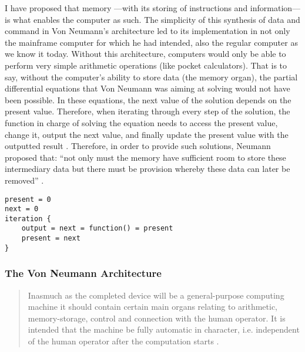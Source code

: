 I have proposed that memory ---with its storing of instructions and information--- is what enables the computer as such. The simplicity of this synthesis of data and command in Von Neumann's architecture led to its implementation in not only the mainframe computer for which he had intended, also the regular computer as we know it today. Without this architecture, computers would only be able to perform very simple arithmetic operations (like pocket calculators). That is to say, without the computer's ability to store data (the memory organ), the partial differential equations that Von Neumann was aiming at solving would not have been possible. In these equations, the next value of the solution depends on the present value. Therefore, when iterating through every step of the solution, the function in charge of solving the equation needs to access the present value, change it, output the next value, and finally update the present value with the outputted result . Therefore, in order to provide such solutions, Neumann proposed that: ``not only must the memory have sufficient room to store these intermediary data but there must be provision whereby these data can later be removed'' \parencite[3]{von46:Pre}.

\begin{flushleft}
\small
\begin{lstlisting}[caption={Pseudocode showing a routine whose next value depends on the present value.},captionpos=b,label={lst:neumann}]
present = 0
next = 0
iteration {
	output = next = function() = present
	present = next
}
\end{lstlisting}
\end{flushleft}


\subsubsection{The Von Neumann Architecture}

\begin{quote}
	Inasmuch as the completed device will be a general-purpose computing machine it should contain certain main organs relating to arithmetic, memory-storage, control and connection with the human operator. It is intended that the machine be fully automatic in character, i.e. independent of the human operator after the computation starts \parencite[1]{von46:Pre}.
\end{quote}

